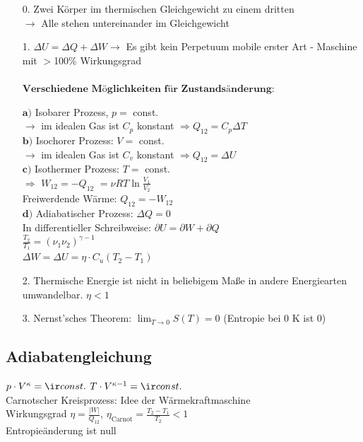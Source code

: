 \documentclass[german]{latex4ei/latex4ei_sheet}
\begin{document}
\begin{itemize}
\item[0.] Zwei Körper im thermischen Gleichgewicht zu einem dritten\\ $\rightarrow$ Alle stehen untereinander im Gleichgewicht\\
\item[1.] $\Delta U = \Delta Q + \Delta W \rightarrow $ Es gibt kein Perpetuum mobile erster Art - Maschine mit $>$100\% Wirkungsgrad\\ \\
$\textbf{Verschiedene Möglichkeiten für Zustandsänderung:}$
\begin{sectionbox}
$\textbf{a)}$ Isobarer Prozess, $p =$ const.\\ $\rightarrow$ im idealen Gas ist $C_p$ konstant $\Rightarrow Q_{12} = C_p \Delta T$\\
$\textbf{b)}$ Isochorer Prozess: $V =$ const.\\ $\rightarrow$ im idealen Gas ist $C_v$ konstant $\Rightarrow Q_{12} = \Delta U$\\
$\textbf{c)}$ Isothermer Prozess: $T =$ const.\\ $\Rightarrow$ $W_{12} = -Q_{12}$ %
$ =\nu RT \ln\frac{V_1}{V_2}$
\\Freiwerdende Wärme: $Q_{12} = -W_{12}$\\
$\textbf{d)}$ Adiabatischer Prozess: $\Delta Q = 0$\\
In differentieller Schreibweise: $\partial U = \partial W + \partial Q $\\
$\frac{T_2}{T_1}=({\nu_1}{\nu_2})^{\gamma -1}$\\
$\Delta W = \Delta U = \eta \cdot C_u(T_2-T_1)$
\end{sectionbox}
\item[2.] Thermische Energie ist nicht in beliebigem Maße in andere Energiearten umwandelbar. $\eta < 1$
\item[3.] Nernst'sches Theorem: $\lim_{T \rightarrow 0} S(T) = 0$ (Entropie bei 0 K ist 0)\\
\end{itemize}

\subsection{Adiabatengleichung}
$p\cdot V^\kappa = \ir const.$ \qquad $T\cdot V^{\kappa -1} = \ir const.$ \\
Carnotscher Kreisprozess: Idee der Wärmekraftmaschine\\
Wirkungsgrad $\eta = \frac{\vert W\vert}{Q_{12}}$, $\eta_{\text{Carnot}} = \frac{T_2-T_1}{T_2} < 1$\\
Entropieänderung ist null
\end{document}
